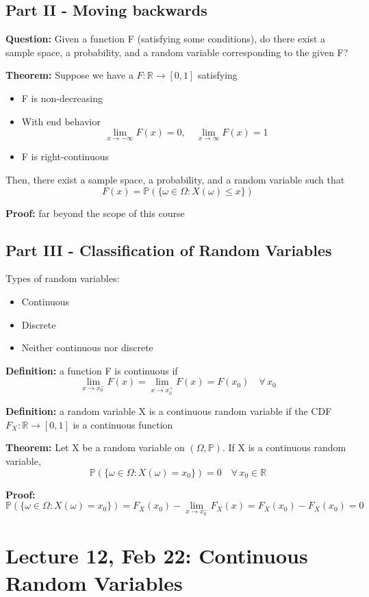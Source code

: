 \documentclass[12pt]{article}
\renewcommand{\P}{\mathbb{P}}
\begin{document}
\subsection*{Part II - Moving backwards}
\textbf{Question:} Given a function F (satisfying some conditions), do there exist a sample space, a probability, and a random variable corresponding to the given F? 

\textbf{Theorem:} 
Suppose we have a $F : \mathbb{R} \to [0, 1]$ satisfying 
\begin{itemize}
    \item F is non-decreasing
    \item With end behavior 
    \[\lim_{x \to -\infty} F(x) = 0, \quad \lim_{x \to \infty} F(x) = 1\]
    \item F is right-continuous
\end{itemize}
Then, there exist a sample space, a probability, and a random variable such that 
\[F(x) =\P(\{\omega \in \Omega : X(\omega) \leq x\})\]

\textbf{Proof:} far beyond the scope of this course 

\subsection*{Part III - Classification of Random Variables}
Types of random variables:
\begin{itemize}
    \item Continuous
    \item Discrete
    \item Neither continuous nor discrete
\end{itemize}

\textbf{Definition:} a function F is continuous if 
\[\lim_{x \to x_0^-} F(x) = \lim_{x \to x_0^+} F(x) = F(x_0) \quad \forall\, x_0\]

\textbf{Definition:} a random variable X is a continuous random variable if the CDF $F_X : \mathbb{R} \to [0, 1]$ is a continuous function 

\textbf{Theorem:} Let X be a random variable on $(\Omega, \P)$. If X is a continuous random variable, 
\[\P(\{\omega \in \Omega : X(\omega) = x_0\}) = 0 \quad \forall \, x_0 \in \mathbb{R}\]

\textbf{Proof:} 
\[\P(\{\omega \in \Omega : X(\omega) = x_0\}) = F_X(x_0) - \lim_{x \to x_0^-} F_X(x) = F_X(x_0) - F_X(x_0) = 0\]


\section*{Lecture 12, Feb 22: Continuous Random Variables}
\end{document}
